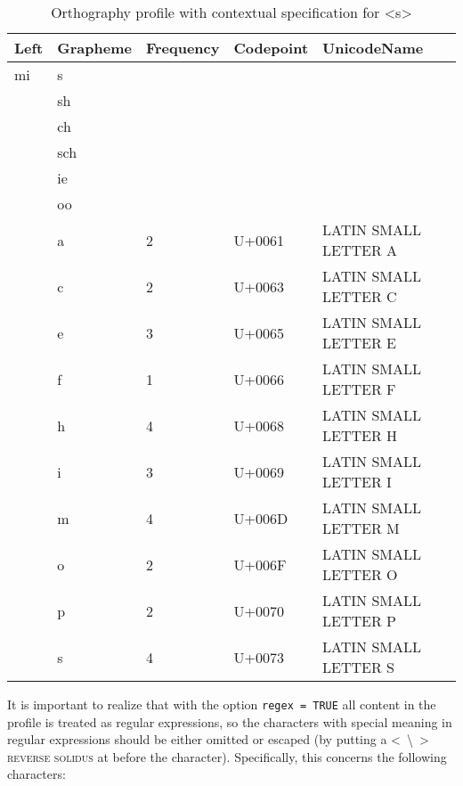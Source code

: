 \documentclass[output=inprep,
		biblatex
		]{LSP/langsci}\usepackage[]{graphicx}\usepackage[]{color}
\begin{document}
\begin{table}[htb]
\centering
\begingroup\scriptsize
\begin{tabular}{lllll}
  \toprule
Left & Grapheme & Frequency & Codepoint & UnicodeName \\ 
  \midrule
mi & s &  &  &  \\ 
   & sh &  &  &  \\ 
   & ch &  &  &  \\ 
   & sch &  &  &  \\ 
   & ie &  &  &  \\ 
   & oo &  &  &  \\ 
   & a & 2 & U+0061 & LATIN SMALL LETTER A \\ 
   & c & 2 & U+0063 & LATIN SMALL LETTER C \\ 
   & e & 3 & U+0065 & LATIN SMALL LETTER E \\ 
   & f & 1 & U+0066 & LATIN SMALL LETTER F \\ 
   & h & 4 & U+0068 & LATIN SMALL LETTER H \\ 
   & i & 3 & U+0069 & LATIN SMALL LETTER I \\ 
   & m & 4 & U+006D & LATIN SMALL LETTER M \\ 
   & o & 2 & U+006F & LATIN SMALL LETTER O \\ 
   & p & 2 & U+0070 & LATIN SMALL LETTER P \\ 
   & s & 4 & U+0073 & LATIN SMALL LETTER S \\ 
   \bottomrule
\end{tabular}
\endgroup
\caption{Orthography profile with contextual specification for <s>} 
\label{tab:profile_skeleton2}
\end{table}


It is important to realize that with the option \texttt{regex = TRUE} all
content in the profile is treated as regular expressions, so the characters with
special meaning in regular expressions should be either omitted or escaped (by
putting a <\ \backslash\ > \textsc{reverse solidus} at  before the
character). Specifically, this concerns the following characters:
\end{document}
